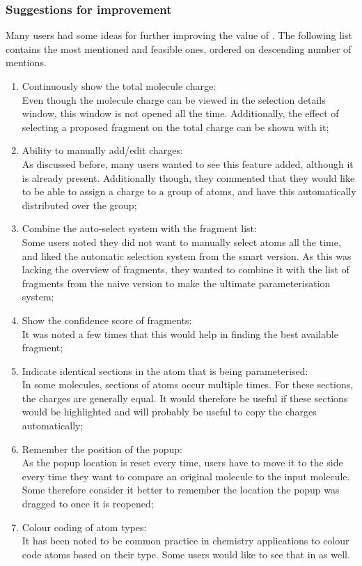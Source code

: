 \subsubsection{Suggestions for improvement}
Many users had some ideas for further improving the value of \oframp. The following list contains the most mentioned and feasible ones, ordered on descending number of mentions.
\begin{enumerate}
\item Continuously show the total molecule charge:\\
Even though the molecule charge can be viewed in the selection details window, this window is not opened all the time. Additionally, the effect of selecting a proposed fragment on the total charge can be shown with it;
\item Ability to manually add/edit charges:\\
As discussed before, many users wanted to see this feature added, although it is already present. Additionally though, they commented that they would like to be able to assign a charge to a group of atoms, and have this automatically distributed over the group;
\item Combine the auto-select system with the fragment list:\\
Some users noted they did not want to manually select atoms all the time, and liked the automatic selection system from the smart version. As this was lacking the overview of fragments, they wanted to combine it with the list of fragments from the naive version to make the ultimate parameterisation system;
\item Show the confidence score of fragments:\\
It was noted a few times that this would help in finding the best available fragment;
\item Indicate identical sections in the atom that is being parameterised:\\
In some molecules, sections of atoms occur multiple times. For these sections, the charges are generally equal. It would therefore be useful if these sections would be highlighted and will probably be useful to copy the charges automatically;
\item Remember the position of the popup:\\
As the popup location is reset every time, users have to move it to the side every time they want to compare an original molecule to the input molecule. Some therefore consider it better to remember the location the popup was dragged to once it is reopened;
\item Colour coding of atom types:\\
It has been noted to be common practice in chemistry applications to colour code atoms based on their type. Some users would like to see that in \oframp{} as well.
\end{enumerate}
